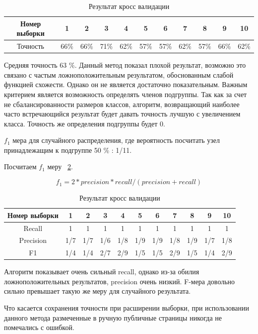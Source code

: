 \documentclass[annotation,times,page4]{itmo-student-thesis}
\begin{document}
\begin{table}[!h]
\caption{Результат кросс валидации}\label{tab2}
\centering
\begin{tabular}{|*{11}{c|}}\hline
Номер выборки & 1 & 2 & 3 & 4 & 5 & 6 & 7 & 8 & 9 & 10 \\\hline
Точность  & 66\% & 66\% & 71\% & 62\% & 57\% & 57\% & 62\% & 57\% & 66\% & 62\% \\\hline
\end{tabular}
\end{table}

Средняя точность 63 \%. Данный метод показал плохой результат, возможно это связано с частым ложноположительным результатом, обоснованным слабой функцией схожести. Однако он не является достаточно показательным. Важным критерием является возможность определять членов подгруппы. Так как за счет не сбалансированности размеров классов, алгоритм, возвращающий наиболее часто встречающийся результат будет давать точность лучшую с увеличением класса. Точность же определения подгруппы будет 0.

$f_{1}$ мера для случайного распределения, где вероятность посчитать узел принадлежащим к подгруппе 50 \% : 1/11.

Посчитаем $f_{1}$ меру ~\ref{tab3}.

\[
    f_{1} = 2 * precision * recall / (precision + recall)
\] 

\begin{table}[!h]
\caption{Результат кросс валидации}\label{tab3}
\centering
\begin{tabular}{|*{11}{c|}}\hline
Номер выборки & 1 & 2 & 3 & 4 & 5 & 6 & 7 & 8 & 9 & 10 \\\hline
Recall  & 1& 1& 1& 1& 1& 1& 1& 1& 1& 1\\\hline
Precision & 1/7 & 1/7& 1/6& 1/8& 1/9& 1/9& 1/8 & 1/9& 1/7& 1/8\\\hline
F1 & 1/4 & 1/4 & 2/7 & 2/9 & 1/5 & 1/5 & 2/9 & 1/5 & 1/4 & 2/9 \\\hline

\end{tabular}
\end{table}

Алгоритм показывает очень сильный recall, однако из-за обилия ложноположительных результатов, precision очень низкий. F-мера довольно сильно превышает такую же меру для случайного результата.
 

Что касается сохранения точности при расширении выборки, при использовании данного метода размеченные в ручную публичные страницы никогда не помечались с ошибкой.
\end{document}
